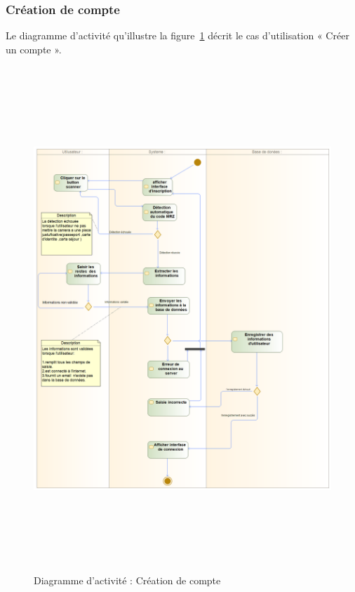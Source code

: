 \subsubsection{Création de compte}
Le diagramme d’activité qu’illustre la figure~\ref{activiteCompte} décrit le cas d’utilisation « Créer un compte ».
\begin{figure}[h!]
	\includegraphics[width=18cm, height=19cm]{./Template LaTeX/Images/ins_act.png}
\caption{Diagramme d’activité : Création de compte}
\label{activiteCompte}

\end{figure}
\newpage
